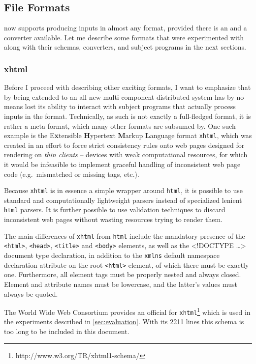 \subsection{File Formats}
\label{sec:formats}
\xmlmate now supports producing inputs in almost any format, provided there is an \xsd and a converter
available. Let me describe some formats that were experimented with along with their schemas, converters, and
subject programs in the next sections.
\tocless\subsubsection{xhtml}
Before I proceed with describing other exciting formats, I want to emphasize that by being extended to an all
new multi-component distributed system \xmlmate has by no means lost its ability to interact with subject
programs that actually process inputs in the \xml format. Technically, \xml as such is not exactly a
full-fledged format, it is rather a meta format, which many other formats are subsumed by. One
such example is the E\textbf{x}tensible \textbf{H}ypertext \textbf{M}arkup \textbf{L}anguage format
\texttt{xhtml}, which was created in an effort to force strict consistency rules onto web pages designed for
rendering on \emph{thin clients} -- devices with weak computational resources, for which it would be infeasible
to implement graceful handling of inconsistent web page code (e.g.\ mismatched or missing tags, etc.). 
 
Because \texttt{xhtml} is in essence a simple \xml wrapper around \texttt{html}, it is possible to use standard
and computationally lightweight \xml parsers instead of specialized lenient \texttt{html} parsers. It is
further possible to use \xml validation techniques to discard inconsistent web pages without wasting resources trying
to render them.

The main differences of \texttt{xhtml} from \texttt{html} include the mandatory presence of the
\texttt{<html>}, \texttt{<head>}, \texttt{<title>} and \texttt{<body>} elements, as well as the {\small
<!DOCTYPE \ldots>} document type declaration, in addition to the \texttt{xmlns} default namespace declaration
attribute on the root \texttt{<html>} element, of which there must be exactly one. Furthermore, all element
tags must be properly nested and always closed. Element and attribute names must be lowercase, and the
latter's values must always be quoted.

The World Wide Web Consortium provides an official \xsd for
\texttt{xhtml}\footnote{http://www.w3.org/TR/xhtml1-schema/} which is used in the \xmlmate experiments
described in \cref{sec:evaluation}. With its 2211 lines this schema is too long to be included
in this document.

